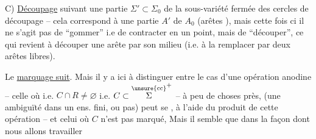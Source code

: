 
C) \uline{Découpage}  suivant une partie  $\Sigma'\subset\Sigma_0$ de la sous-variété fermée des cercles de découpage -- cela correspond à une partie $A'$ de $A_0$ (arêtes ), mais cette fois ci il ne s'agit pas de ``gommer'' i.e de contracter en un point, mais de ``découper'', ce qui  revient à découper une arête par son milieu (i.e. à la remplacer par deux arêtes libres).

Le \uline{marquage suit}.  Mais il y a ici à distinguer entre le cas d'une opération anodine  -- celle où   i.e. $C\cap R\ne\varnothing$ i.e. $C\subset\overset{\unsure{\mathrm{cc}}}{\Sigma}^+$ --  à peu de choses près, (une ambiguïté dans un ens. fini,  ou pas) peut se , à l'aide du produit de cette opération -- et celui où $C$ n'est pas marqué, Mais il semble que dans la façon dont nous allons travailler



